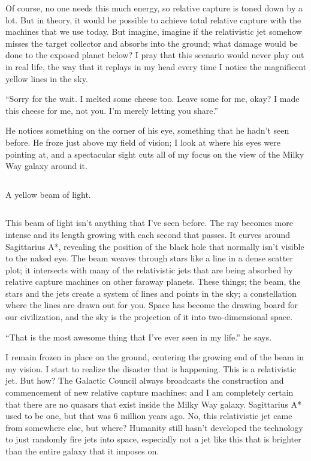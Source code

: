 \documentclass{book}
\newcommand{\spacer}{\[\]}
\begin{document}
			Of course, no one needs this much energy, so relative capture is toned down by a lot.
			But in theory, it would be possible to achieve total relative capture with the machines
			that we use today. But imagine, imagine if the relativistic jet somehow misses the
			target collector and absorbs into the ground; what damage would be done to the exposed
			planet below? I pray that this scenario would never play out in real life, the way that
			it replays in my head every time I notice the magnificent yellow lines in the sky.

			``Sorry for the wait. I melted some cheese too. Leave some for me, okay? I made this
			cheese for me, not you. I'm merely letting you share.''

			He notices something on the corner of his eye, something that he hadn't seen before.
			He froze just above my field of vision; I look at where his eyes were pointing at, and
			a spectacular sight cuts all of my focus on the view of the Milky Way galaxy around it.

			\spacer{}

			A yellow beam of light.

			\spacer{}

			This beam of light isn't anything that I've seen before. The ray becomes more intense
			and its length growing with each second that passes. It curves around Sagittarius A*,
			revealing the position of the black hole that normally isn't visible to the naked eye.
			The beam weaves through stars like a line in a dense scatter plot; it intersects with
			many of the relativistic jets that are being absorbed by relative capture machines on
			other faraway planets. These things; the beam, the stars and the jets create a system
			of lines and points in the sky; a constellation where the lines are drawn out for you.
			Space has become the drawing board for our civilization, and the sky is the projection
			of it into two-dimensional space.

			``That is the most awesome thing that I've ever seen in my life.'' he says.

			I remain frozen in place on the ground, centering the growing end of the beam in my
			vision. I start to realize the disaster that is happening. This is a relativistic jet.
			But how? The Galactic Council always broadcasts the construction and commencement of
			new relative capture machines; and I am completely certain that there are no quasars
			that exist inside the Milky Way galaxy. Sagittarius A* used to be one, but that was
			6 million years ago. No, this relativistic jet came from somewhere else, but where?
			Humanity still hasn't developed the technology to just randomly fire jets into space,
			especially not a jet like this that is brighter than the entire galaxy that it imposes
			on.
\end{document}
